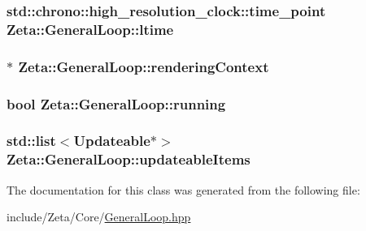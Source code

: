 \hypertarget{classZeta_1_1GeneralLoop_a885569a048470ed6451c1d7e95e56df5}{
\subsubsection[{ltime}]{\setlength{\rightskip}{0pt plus 5cm}std\+::chrono\+::high\+\_\+resolution\+\_\+clock\+::time\+\_\+point Zeta\+::\+General\+Loop\+::ltime\hspace{0.3cm}{\ttfamily [private]}}}\label{classZeta_1_1GeneralLoop_a885569a048470ed6451c1d7e95e56df5}
\hypertarget{classZeta_1_1GeneralLoop_ac9c60e031a0455d332294c2f38098ad0}{
\subsubsection[{rendering\+Context}]{$\ast$ Zeta\+::\+General\+Loop\+::rendering\+Context\hspace{0.3cm}{\ttfamily [private]}}}\label{classZeta_1_1GeneralLoop_ac9c60e031a0455d332294c2f38098ad0}
\hypertarget{classZeta_1_1GeneralLoop_acf550e56f0fddfcd5f9a5cb35ba036e3}{
\subsubsection[{running}]{\setlength{\rightskip}{0pt plus 5cm}bool Zeta\+::\+General\+Loop\+::running\hspace{0.3cm}{\ttfamily [private]}}}\label{classZeta_1_1GeneralLoop_acf550e56f0fddfcd5f9a5cb35ba036e3}
\hypertarget{classZeta_1_1GeneralLoop_af765b95f83aad985b7d056d154335db9}{
\subsubsection[{updateable\+Items}]{\setlength{\rightskip}{0pt plus 5cm}std\+::list$<${\bf Updateable}$\ast$$>$ Zeta\+::\+General\+Loop\+::updateable\+Items\hspace{0.3cm}{\ttfamily [private]}}}\label{classZeta_1_1GeneralLoop_af765b95f83aad985b7d056d154335db9}


The documentation for this class was generated from the following file\+:\begin{DoxyCompactItemize}
\item 
include/\+Zeta/\+Core/\hyperlink{GeneralLoop_8hpp}{General\+Loop.\+hpp}\end{DoxyCompactItemize}
